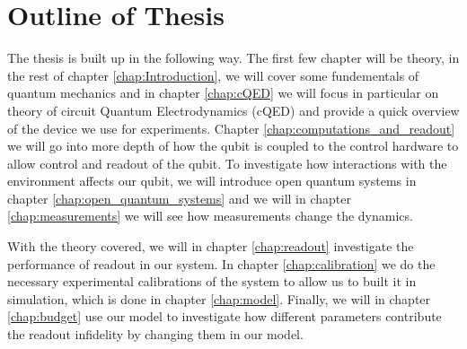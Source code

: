 
\newpage
\section{Outline of Thesis}
The thesis is built up in the following way. The first few chapter will be theory, in the rest of chapter \ref{chap:Introduction}, we will cover some fundementals of quantum mechanics and in chapter \ref{chap:cQED} we will focus in particular on theory of circuit Quantum Electrodynamics (cQED) and provide a quick overview of the device we use for experiments. Chapter \ref{chap:computations_and_readout} we will go into more depth of how the qubit is coupled to the control hardware to allow control and readout of the qubit. To investigate how interactions with the environment affects our qubit, we will introduce open quantum systems in chapter \ref{chap:open_quantum_systems} and we will in chapter \ref{chap:measurements} we will see how measurements change the dynamics.

With the theory covered, we will in chapter \ref{chap:readout} investigate the performance of readout in our system. In chapter \ref{chap:calibration} we do the necessary experimental calibrations of the system to allow us to built it in simulation, which is done in chapter \ref{chap:model}. Finally, we will in chapter \ref{chap:budget} use our model to investigate how different parameters contribute the readout infidelity by changing them in our model.  



